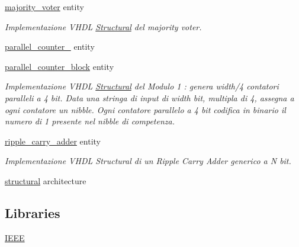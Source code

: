 \begin{DoxyCompactItemize}
\hyperlink{classmajority__voter}{majority\+\_\+voter} entity
\begin{DoxyCompactList}\small\item\em Implementazione V\+H\+D\+L \hyperlink{classmajority__voter_1_1_structural}{Structural} del majority voter. \end{DoxyCompactList}\item 
\hyperlink{classparallel__counter__4}{parallel\+\_\+counter\+\_} entity
\item 
\hyperlink{classparallel__counter__block}{parallel\+\_\+counter\+\_\+block} entity
\begin{DoxyCompactList}\small\item\em Implementazione V\+H\+D\+L \hyperlink{classparallel__counter__block_1_1_structural}{Structural} del Modulo 1 \+: genera width/4 contatori paralleli a 4 bit. Data una stringa di input di width bit, multipla di 4, assegna a ogni contatore un nibble. Ogni contatore parallelo a 4 bit codifica in binario il numero di 1 presente nel nibble di competenza. \end{DoxyCompactList}\item 
\hyperlink{classripple__carry__adder}{ripple\+\_\+carry\+\_\+adder} entity
\begin{DoxyCompactList}\small\item\em Implementazione V\+H\+D\+L Structural di un Ripple Carry Adder generico a N bit. \end{DoxyCompactList}\item 
\hyperlink{classripple__carry__adder_1_1structural}{structural} architecture
\end{DoxyCompactItemize}
\subsection*{Libraries}
 \begin{DoxyCompactItemize}
\item 
\hypertarget{group___majority_voter_gae4f03c286607f3181e16b9aa12d0c6d4}{\hyperlink{group___majority_voter_gae4f03c286607f3181e16b9aa12d0c6d4}{I\+E\+E\+E} }\label{group___majority_voter_gae4f03c286607f3181e16b9aa12d0c6d4}

\end{DoxyCompactItemize}
